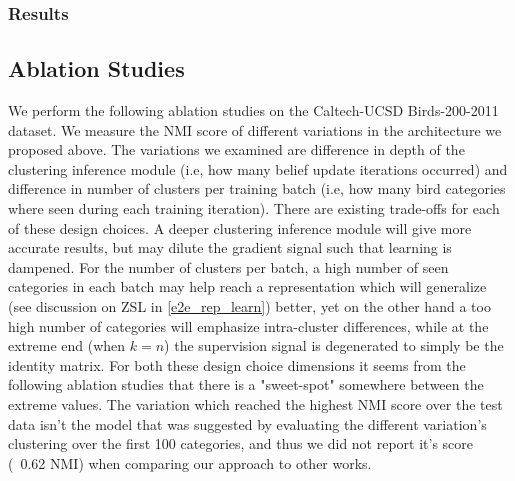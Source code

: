\subsubsection{Results}
\subsection{Ablation Studies}
We perform the following ablation studies on the Caltech-UCSD Birds-200-2011 dataset. We measure the NMI score of different variations in the architecture we proposed above. The variations we examined are difference in depth of the clustering inference module (i.e, how many belief update iterations occurred) and difference in number of clusters per training batch (i.e, how many bird categories where seen during each training iteration). There are existing trade-offs for each of these design choices. A deeper clustering inference module will give more accurate results, but may dilute the gradient signal such that learning is dampened. For the number of clusters per batch, a high number of seen categories in each batch may help reach a representation which will generalize (see discussion on ZSL in \ref{e2e_rep_learn}) better, yet on the other hand a too high number of categories will emphasize intra-cluster differences, while at the extreme end (when $k=n$) the supervision signal is degenerated to simply be the identity matrix. For both these design choice dimensions it seems from the following ablation studies that there is a "sweet-spot" somewhere between the extreme values. The variation which reached the highest NMI score over the test data isn't the model that was suggested by evaluating the different variation's clustering over the first 100 categories, and thus we did not report it's score (~0.62 NMI) when comparing our approach to other works. 

